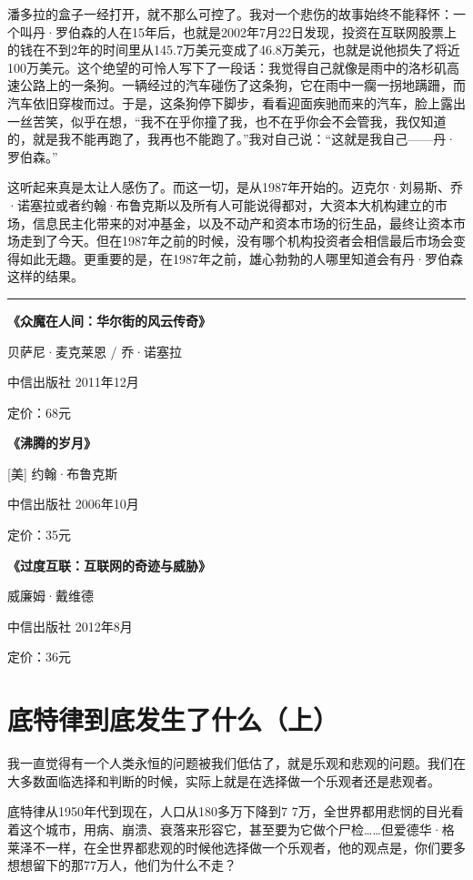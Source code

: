 潘多拉的盒子一经打开，就不那么可控了。我对一个悲伤的故事始终不能释怀：一个叫丹·罗伯森的人在15年后，也就是2002年7月22日发现，投资在互联网股票上的钱在不到2年的时间里从145.7万美元变成了46.8万美元，也就是说他损失了将近100万美元。这个绝望的可怜人写下了一段话：我觉得自己就像是雨中的洛杉矶高速公路上的一条狗。一辆经过的汽车碰伤了这条狗，它在雨中一瘸一拐地蹒跚，而汽车依旧穿梭而过。于是，这条狗停下脚步，看看迎面疾驰而来的汽车，脸上露出一丝苦笑，似乎在想，``我不在乎你撞了我，也不在乎你会不会管我，我仅知道的，就是我不能再跑了，我再也不能跑了。''我对自己说：``这就是我自己------丹·罗伯森。''

这听起来真是太让人感伤了。而这一切，是从1987年开始的。迈克尔·刘易斯、乔·诺塞拉或者约翰·布鲁克斯以及所有人可能说得都对，大资本大机构建立的市场，信息民主化带来的对冲基金，以及不动产和资本市场的衍生品，最终让资本市场走到了今天。但在1987年之前的时候，没有哪个机构投资者会相信最后市场会变得如此无趣。更重要的是，在1987年之前，雄心勃勃的人哪里知道会有丹·罗伯森这样的结果。

\begin{center}\rule{0.5\linewidth}{0.5pt}\end{center}

\textbf{《众魔在人间：华尔街的风云传奇》}

贝萨尼·麦克莱恩 / 乔·诺塞拉

中信出版社 2011年12月

定价：68元

\textbf{《沸腾的岁月》}

{[}美{]} 约翰·布鲁克斯

中信出版社 2006年10月

定价：35元

\textbf{《过度互联：互联网的奇迹与威胁》}

威廉姆·戴维德

中信出版社 2012年8月

定价：36元

\hypertarget{ux5e95ux7279ux5f8bux5230ux5e95ux53d1ux751fux4e86ux4ec0ux4e48ux4e0a}{%
\section{底特律到底发生了什么（上）}\label{ux5e95ux7279ux5f8bux5230ux5e95ux53d1ux751fux4e86ux4ec0ux4e48ux4e0a}}

我一直觉得有一个人类永恒的问题被我们低估了，就是乐观和悲观的问题。我们在大多数面临选择和判断的时候，实际上就是在选择做一个乐观者还是悲观者。

底特律从1950年代到现在，人口从180多万下降到7
7万，全世界都用悲悯的目光看着这个城市，用病、崩溃、衰落来形容它，甚至要为它做个尸检\ldots\ldots 但爱德华·格莱泽不一样，在全世界都悲观的时候他选择做一个乐观者，他的观点是，你们要多想想留下的那77万人，他们为什么不走？

